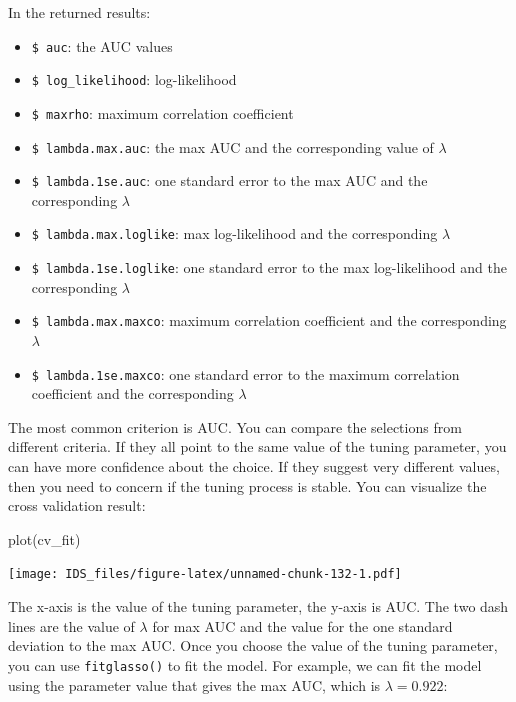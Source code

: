 \documentclass[
  12pt,
]{krantz}
\makeatletter
\newenvironment{Shaded}{\begin{snugshade}}{\end{snugshade}}
\newcommand{\FunctionTok}[1]{\textcolor[rgb]{0,0,0}{#1}}
\newcommand{\NormalTok}[1]{#1}
\providecommand{\tightlist}{%
  \setlength{\itemsep}{0pt}\setlength{\parskip}{0pt}}
\newenvironment{kframe}{%
\medskip{}
\setlength{\fboxsep}{.8em}
 \def\at@end@of@kframe{}%
 \ifinner\ifhmode%
  \def\at@end@of@kframe{\end{minipage}}%
  \begin{minipage}{\columnwidth}%
 \fi\fi%
 \def\FrameCommand##1{\hskip\@totalleftmargin \hskip-\fboxsep
 \colorbox{shadecolor}{##1}\hskip-\fboxsep
     \hskip-\linewidth \hskip-\@totalleftmargin \hskip\columnwidth}%
 \MakeFramed {\advance\hsize-\width
   \@totalleftmargin\z@ \linewidth\hsize
   \@setminipage}}%
 {\par\unskip\endMakeFramed%
 \at@end@of@kframe}
\renewenvironment{Shaded}{\begin{kframe}}{\end{kframe}}
\makeatother
\begin{document}
In the returned results:

\begin{itemize}
\tightlist
\item
  \texttt{\$\ auc}: the AUC values
\item
  \texttt{\$\ log\_likelihood}: log-likelihood
\item
  \texttt{\$\ maxrho}: maximum correlation coefficient
\item
  \texttt{\$\ lambda.max.auc}: the max AUC and the corresponding value of \(\lambda\)
\item
  \texttt{\$\ lambda.1se.auc}: one standard error to the max AUC and the corresponding \(\lambda\)
\item
  \texttt{\$\ lambda.max.loglike}: max log-likelihood and the corresponding \(\lambda\)
\item
  \texttt{\$\ lambda.1se.loglike}: one standard error to the max log-likelihood and the corresponding \(\lambda\)
\item
  \texttt{\$\ lambda.max.maxco}: maximum correlation coefficient and the corresponding \(\lambda\)
\item
  \texttt{\$\ lambda.1se.maxco}: one standard error to the maximum correlation coefficient and the corresponding \(\lambda\)
\end{itemize}

The most common criterion is AUC. You can compare the selections from different criteria. If they all point to the same value of the tuning parameter, you can have more confidence about the choice. If they suggest very different values, then you need to concern if the tuning process is stable. You can visualize the cross validation result:

\begin{Shaded}
\begin{Highlighting}[]
\FunctionTok{plot}\NormalTok{(cv\_fit)}
\end{Highlighting}
\end{Shaded}

\texttt{[image: IDS\_files/figure-latex/unnamed-chunk-132-1.pdf]}

The x-axis is the value of the tuning parameter, the y-axis is AUC. The two dash lines are the value of \(\lambda\) for max AUC and the value for the one standard deviation to the max AUC. Once you choose the value of the tuning parameter, you can use \texttt{fitglasso()} to fit the model. For example, we can fit the model using the parameter value that gives the max AUC, which is \(\lambda=0.922\):
\end{document}
